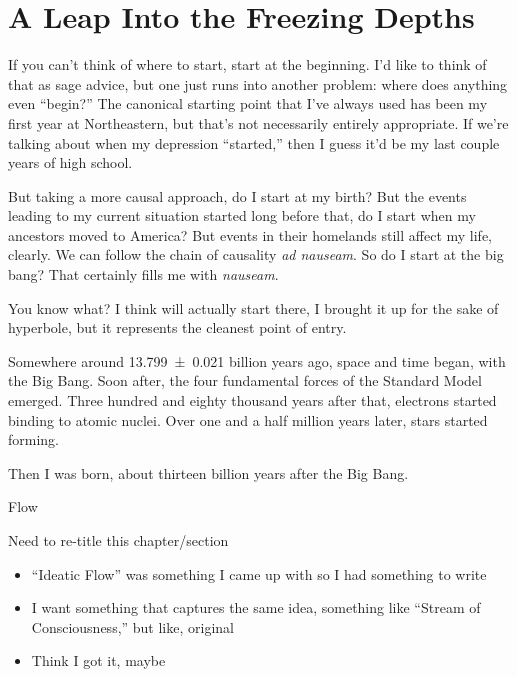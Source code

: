 \documentclass[./butidigress.tex]{subfiles}
\begin{document}
\chapter{A Leap Into the Freezing Depths}\label{chap:aleap}
\newpage

If you can't think of where to start, start at the beginning.
I'd like to think of that as sage advice, but one just runs into another problem: where does anything even \enquote{begin?}
The canonical starting point that I've always used has been my first year at Northeastern, but that's not necessarily entirely appropriate.
If we're talking about when my depression \enquote{started,} then I guess it'd be my last couple years of high school.

But taking a more causal approach, do I start at my birth?
But the events leading to my current situation started long before that\lips, do I start when my ancestors moved to America?
But events in their homelands still affect my life, clearly.
We can follow the chain of causality \textit{ad nauseam}.
So do I start at the big bang?
That certainly fills me with \textit{nauseam}.

You know what?
I think will actually start there, I brought it up for the sake of hyperbole, but it represents the cleanest point of entry.

Somewhere around \num{13.799+-0.021} billion years ago,\autocite[32]{planckcollab} space and time began, with the Big Bang.
Soon after, the four fundamental forces of the Standard Model emerged.
Three hundred and eighty thousand years after that, electrons started binding to atomic nuclei.
Over one and a half million years later, stars started forming.

Then I was born, about thirteen billion years after the Big Bang.

\begin{somenotes}{Flow}
    \item Need to re-title this chapter/section\lips
    \begin{itemize}
        \item \enquote{Ideatic Flow} was something I came up with so I had something to write
        \item I want something that captures the same idea, something like \enquote{Stream of Consciousness,} but like, original
        \item Think I got it, maybe
    \end{itemize}
\end{somenotes}
\end{document}
